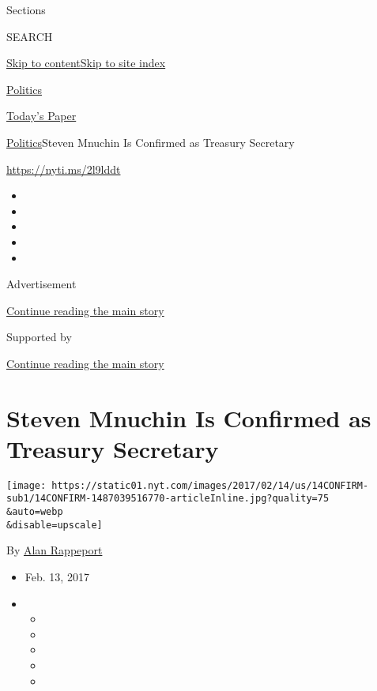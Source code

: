 Sections

SEARCH

\protect\hyperlink{site-content}{Skip to
content}\protect\hyperlink{site-index}{Skip to site index}

\href{https://www.nytimes.com/section/politics}{Politics}

\href{https://myaccount.nytimes.com/auth/login?response_type=cookie\&client_id=vi}{}

\href{https://www.nytimes.com/section/todayspaper}{Today's Paper}

\href{/section/politics}{Politics}\textbar{}Steven Mnuchin Is Confirmed
as Treasury Secretary

\url{https://nyti.ms/2l9lddt}

\begin{itemize}
\item
\item
\item
\item
\item
\end{itemize}

Advertisement

\protect\hyperlink{after-top}{Continue reading the main story}

Supported by

\protect\hyperlink{after-sponsor}{Continue reading the main story}

\hypertarget{steven-mnuchin-is-confirmed-as-treasury-secretary}{%
\section{Steven Mnuchin Is Confirmed as Treasury
Secretary}\label{steven-mnuchin-is-confirmed-as-treasury-secretary}}

\texttt{[image: https://static01.nyt.com/images/2017/02/14/us/14CONFIRM-sub1/14CONFIRM-1487039516770-articleInline.jpg?quality=75\\\&auto=webp\\\&disable=upscale]}

By \href{https://www.nytimes.com/by/alan-rappeport}{Alan Rappeport}

\begin{itemize}
\item
  Feb. 13, 2017
\item
  \begin{itemize}
  \item
  \item
  \item
  \item
  \item
  \end{itemize}
\end{itemize}

